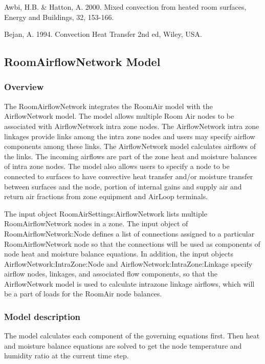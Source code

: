 Awbi, H.B. \& Hatton, A. 2000. Mixed convection from heated room surfaces, Energy and Buildings, 32, 153-166.

Bejan, A. 1994. Convection Heat Transfer 2nd ed, Wiley, USA.

\subsection{RoomAirflowNetwork Model}\label{roomairflownetwork-model}

\subsubsection{Overview}\label{overview-4-001}

The RoomAirflowNetwork integrates the RoomAir model with the AirflowNetwork model. The model allows multiple Room Air nodes to be associated with AirflowNetwork intra zone nodes. The AirflowNetwork intra zone linkages provide links among the intra zone nodes and users may specify airflow components among these links. The AirflowNetwork model calculates airflows of the links. The incoming airflows are part of the zone heat and moisture balances of intra zone nodes. The model also allows users to specify a node to be connected to surfaces to have convective heat transfer and/or moisture transfer between surfaces and the node, portion of internal gains and supply air and return air fractions from zone equipment and AirLoop terminals.

The input object RoomAirSettings:AirflowNetwork lists multiple RoomAirflowNetwork nodes in a zone. The input object of RoomAirflowNetwork:Node defines a list of connections assigned to a particular RoomAirflowNetwork node so that the connections will be used as components of node heat and moisture balance equations. In addition, the input objects AirflowNetwork:IntraZone:Node and AirflowNetwork:IntraZone:Linkage specify airflow nodes, linkages, and associated flow components, so that the AirflowNetwork model is used to calculate intrazone linkage airflows, which will be a part of loads for the RoomAir node balances.

\subsubsection{Model description}\label{model-description-3-001}

The model calculates each component of the governing equations first. Then heat and moisture balance equations are solved to get the node temperature and humidity ratio at the current time step.

